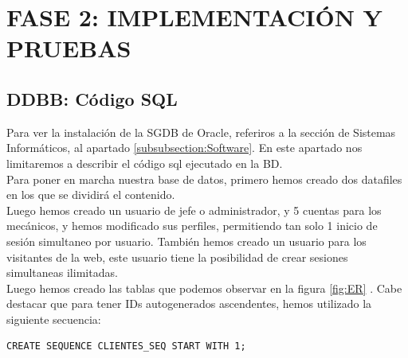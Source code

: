 \documentclass{article}
\begin{document}
\section{FASE 2: IMPLEMENTACIÓN Y PRUEBAS}
{
\subsection{DDBB: Código SQL}
Para ver la instalación de la SGDB de Oracle, referiros a la sección de Sistemas Informáticos, al apartado \ref{subsubsection:Software}. En este apartado nos limitaremos a describir el código sql ejecutado en la BD.\\
Para poner en marcha nuestra base de datos, primero hemos creado dos datafiles en los que se dividirá el contenido. \\ Luego hemos creado un usuario de jefe o administrador, y 5 cuentas para los mecánicos, y hemos modificado sus perfiles,
permitiendo tan solo 1 inicio de sesión simultaneo por usuario. También hemos creado un usuario para los visitantes de la web, este usuario tiene la posibilidad de crear sesiones simultaneas ilimitadas. \\ 
Luego hemos creado las tablas que podemos observar en la figura \ref{fig:ER} . Cabe destacar que para tener IDs autogenerados ascendentes, hemos utilizado la siguiente secuencia:\\
\begin{lstlisting}[caption=Código sql para autogenerar IDs]
  CREATE SEQUENCE CLIENTES_SEQ START WITH 1;


\end{lstlisting}}
\end{document}
